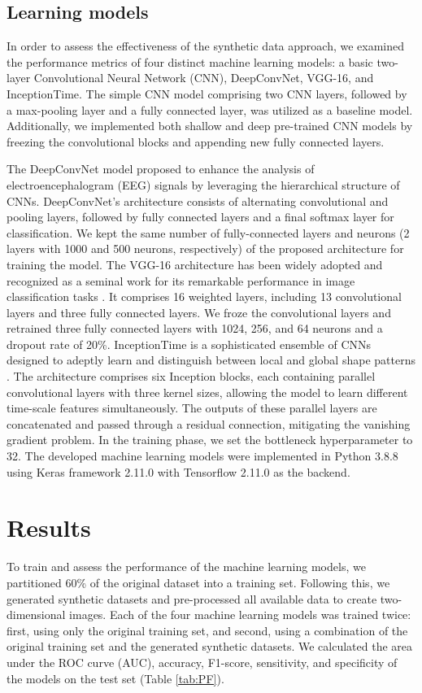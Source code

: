 \documentclass{article}
\begin{document}
\subsection{Learning models}
In order to assess the effectiveness of the synthetic data approach, we examined the performance metrics of four distinct machine learning models: a basic two-layer Convolutional Neural Network (CNN), DeepConvNet, VGG-16, and InceptionTime. The simple CNN model comprising two CNN layers, followed by a max-pooling layer and a fully connected layer, was utilized as a baseline model. Additionally, we implemented both shallow and deep pre-trained CNN models by freezing the convolutional blocks and appending new fully connected layers.

\par The DeepConvNet model \cite{schirrmeister2017deep} proposed to enhance the analysis of electroencephalogram (EEG) signals by leveraging the hierarchical structure of CNNs. DeepConvNet's architecture consists of alternating convolutional and pooling layers, followed by fully connected layers and a final softmax layer for classification. We kept the same number of fully-connected layers and neurons (2 layers with 1000 and 500 neurons, respectively) of the proposed architecture for training the model. The VGG-16 architecture has been widely adopted and recognized as a seminal work for its remarkable performance in image classification tasks \cite{simonyan2014very}. It comprises 16 weighted layers, including 13 convolutional layers and three fully connected layers. We froze the convolutional layers and retrained three fully connected layers with 1024, 256, and 64 neurons and a dropout rate of 20\%. InceptionTime is a sophisticated ensemble of CNNs designed to adeptly learn and distinguish between local and global shape patterns \cite{rafiei2022automated}. The architecture comprises six Inception blocks, each containing parallel convolutional layers with three kernel sizes, allowing the model to learn different time-scale features simultaneously. The outputs of these parallel layers are concatenated and passed through a residual connection, mitigating the vanishing gradient problem. In the training phase, we set the bottleneck hyperparameter to 32. The developed machine learning models were implemented in Python 3.8.8 using Keras framework 2.11.0 with Tensorflow 2.11.0 as the backend.


\section{Results}
To train and assess the performance of the machine learning models, we partitioned 60\% of the original dataset into a training set. Following this, we generated synthetic datasets and pre-processed all available data to create two-dimensional images. Each of the four machine learning models was trained twice: first, using only the original training set, and second, using a combination of the original training set and the generated synthetic datasets. We calculated the area under the ROC curve (AUC), accuracy, F1-score, sensitivity, and specificity of the models on the test set (Table \ref{tab:PF}).
\end{document}
